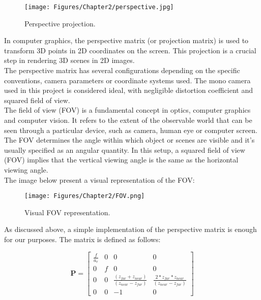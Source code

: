 \begin{figure}[th]
    \centering
    \texttt{[image: Figures/Chapter2/perspective.jpg]}
    \caption[Perspective projection]{Perspective projection.}
    \label{fig:Projection}
\end{figure}

In computer graphics, the perspective matrix (or projection matrix) is used to transform 3D points in 2D coordinates on the screen. This projection is a crucial step in rendering 3D scenes in 2D images.\parencite{HughesDamEtAl13}\\
\noindent
The perspective matrix has several configurations depending on the specific conventions, camera parameters or coordinate systems used. The mono camera used in this project is considered ideal, with negligible distortion coefficient and squared field of view. \\
The field of view (FOV) is a fundamental concept in optics, computer graphics and computer vision. It refers to the extent of the observable world that can be seen through a particular device, such as camera, human eye or computer screen. The FOV determines the angle within which object or scenes are visible and it's usually specified as an angular quantity. In this setup, a squared field of view (FOV) implies that the vertical viewing angle is the same as the horizontal viewing angle. \\
The image below present a visual representation of the FOV:

\begin{figure}[th]
    \centering
    \texttt{[image: Figures/Chapter2/FOV.png]}
    \caption[FOV]{Visual FOV representation.}
    \label{fig:FOV}
\end{figure}

\noindent
As discussed above, a simple implementation of the perspective matrix is enough for our purposes. The matrix is defined as follows:

\begin{equation}
    \textbf{P} = 
    \begin{bmatrix}
    \frac{f}{a_{r}} & 0 & 0 & 0\\
    0 & f & 0 & 0\\
    0 & 0 & \frac{(z_{far} + z_{near})}{(z_{near} - z_{far})} & \frac{2*z_{far}*z_{near}}{(z_{near} - z_{far})}\\
    0 & 0 & -1 & 0
\end{bmatrix}
\end{equation}

